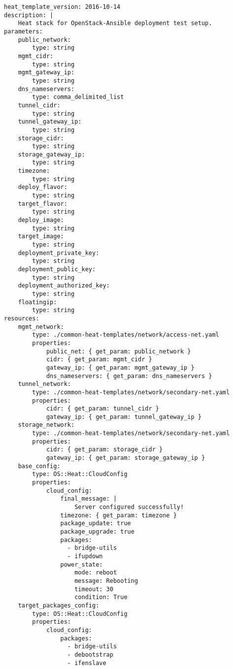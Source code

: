  \label{heat-templates}

\begin{verbatim}
heat_template_version: 2016-10-14
description: |
    Heat stack for OpenStack-Ansible deployment test setup.
parameters:
    public_network:
        type: string
    mgmt_cidr:
        type: string
    mgmt_gateway_ip:
        type: string
    dns_nameservers:
        type: comma_delimited_list
    tunnel_cidr:
        type: string
    tunnel_gateway_ip:
        type: string
    storage_cidr:
        type: string
    storage_gateway_ip:
        type: string
    timezone:
        type: string
    deploy_flavor:
        type: string
    target_flavor:
        type: string
    deploy_image:
        type: string
    target_image:
        type: string
    deployment_private_key:
        type: string
    deployment_public_key:
        type: string
    deployment_authorized_key:
        type: string
    floatingip:
        type: string
resources:
    mgmt_network:
        type: ./common-heat-templates/network/access-net.yaml
        properties:
            public_net: { get_param: public_network }
            cidr: { get_param: mgmt_cidr }
            gateway_ip: { get_param: mgmt_gateway_ip }
            dns_nameservers: { get_param: dns_nameservers }
    tunnel_network:
        type: ./common-heat-templates/network/secondary-net.yaml
        properties:
            cidr: { get_param: tunnel_cidr }
            gateway_ip: { get_param: tunnel_gateway_ip }
    storage_network:
        type: ./common-heat-templates/network/secondary-net.yaml
        properties:
            cidr: { get_param: storage_cidr }
            gateway_ip: { get_param: storage_gateway_ip }
    base_config:
        type: OS::Heat::CloudConfig
        properties:
            cloud_config:
                final_message: |
                    Server configured successfully!
                timezone: { get_param: timezone }
                package_update: true
                package_upgrade: true
                packages:
                  - bridge-utils
                  - ifupdown
                power_state:
                    mode: reboot
                    message: Rebooting
                    timeout: 30
                    condition: True
    target_packages_config:
        type: OS::Heat::CloudConfig
        properties:
            cloud_config:
                packages:
                  - bridge-utils
                  - debootstrap
                  - ifenslave

\end{verbatim}
